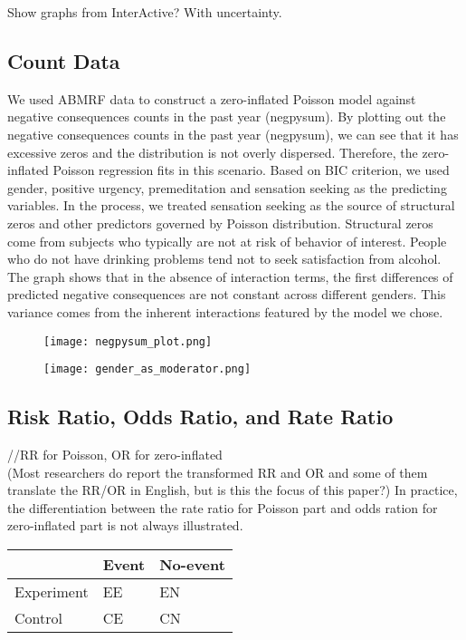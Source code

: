 \documentclass[jou, apacite]{apa6}
\begin{document}
Show graphs from InterActive? With uncertainty.

\subsection{Count Data}
We used ABMRF data to construct a zero-inflated Poisson model against negative consequences counts in the past year (negpysum). By plotting out the negative consequences counts in the past year (negpysum), we can see that it has excessive zeros and the distribution is not overly dispersed.  Therefore, the zero-inflated Poisson regression fits in this scenario. Based on BIC criterion, we used gender, positive urgency, premeditation and sensation seeking as the predicting variables. In the process, we treated sensation seeking as the source of structural zeros and other predictors governed by Poisson distribution. Structural zeros come from subjects who typically are not at risk of behavior of interest. People who do not have drinking problems tend not to seek satisfaction from alcohol. The graph shows that in the absence of interaction terms, the first differences of predicted negative consequences are not constant across different genders. This variance comes from the inherent interactions featured by the model we chose.

\begin{figure}[h]
\texttt{[image: negpysum\_plot.png]}
\end{figure}

\begin{figure}[h]
\texttt{[image: gender\_as\_moderator.png]}
\end{figure}

\subsection{Risk Ratio, Odds Ratio, and Rate Ratio}
//RR for Poisson, OR for zero-inflated \\
(Most researchers do report the transformed RR and OR and some of them translate the RR/OR in English, but is this the focus of this paper?)
In practice, the differentiation between the rate ratio for Poisson part and odds ration for zero-inflated part is not always illustrated. \\

\begin{center}
\begin{tabular}{ |m{4em}|m{1cm}|m{1cm}| } 
\hline
	& Event & No-event \\
\hline
Experiment & EE & EN \\
\hline
Control & CE & CN \\
\hline
\end{tabular}
\end{center}
\end{document}
